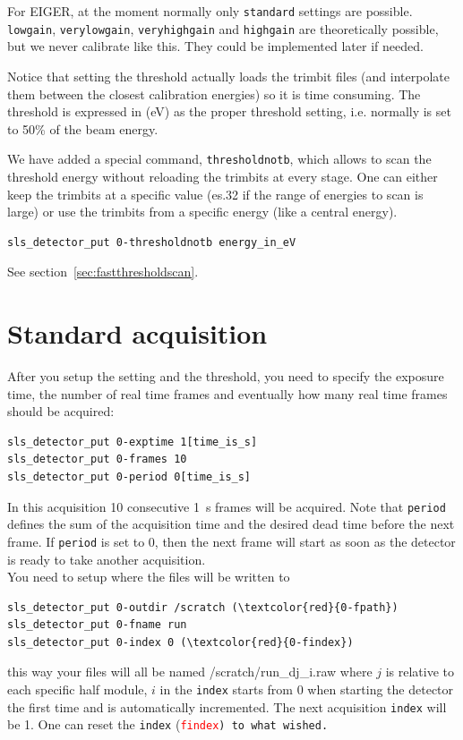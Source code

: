 \documentclass{article}
\newcommand{\E}{EIGER\xspace}
\begin{document}
For \E, at the moment normally only {\tt{standard}} settings are possible.
 {\tt{lowgain}}, {\tt{verylowgain}}, {\tt{veryhighgain}} and {\tt{highgain}} are theoretically possible, but we never calibrate like this. They could be implemented later if needed. 

Notice that setting the threshold actually loads the trimbit files (and interpolate them between the closest calibration energies) so it is time consuming. 
The threshold is expressed in (eV) as the proper threshold setting, i.e. normally is set to 50\% of the beam energy.  

We have added a special command, {\tt{thresholdnotb}}, which allows to scan the threshold energy without reloading the trimbits at every stage. One can either keep the trimbits at a specific value (es.32 if the range of energies to scan is large) or use the trimbits from a specific energy (like a central energy).
\begin{verbatim}
sls_detector_put 0-thresholdnotb energy_in_eV
\end{verbatim}
See section~\ref{sec:fastthresholdscan}.

\section{Standard acquisition}

After you setup the setting and the threshold, you need to specify the exposure time, the number of real time frames and eventually how many real time frames should be acquired:
\begin{verbatim}
sls_detector_put 0-exptime 1[time_is_s]
sls_detector_put 0-frames 10
sls_detector_put 0-period 0[time_is_s]
\end{verbatim}
In this acquisition 10 consecutive 1~s frames will be acquired. Note that {\tt{period}} defines the sum of the acquisition time and the desired dead time before the next frame. If {\tt{period}} is set to 0, then the next frame will start as soon as the detector is ready to take another acquisition. \\


You need to setup where the files will be written to
\begin{verbatim}
sls_detector_put 0-outdir /scratch (\textcolor{red}{0-fpath})
sls_detector_put 0-fname run
sls_detector_put 0-index 0 (\textcolor{red}{0-findex})
\end{verbatim}
this way your files will all be named /scratch/run\_dj\_i.raw where $j$ is relative to each specific half module, $i$ in the {\tt{index}} starts from 0 when starting the detector the first time and is automatically incremented. The next acquisition {\tt{index}} will be 1. One can reset the  {\tt{index}} (\tt{\textcolor{red}{findex}}) to what wished.
\end{document}
